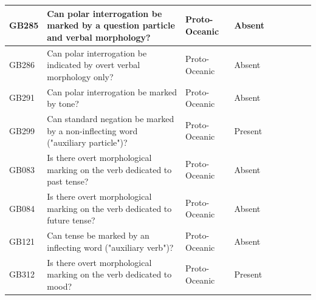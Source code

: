 \documentclass[draft,10pt]{article} %
\begin{document}
\begin{landscape}
\begin{longtable}{| p{2cm}| p{3cm}| p{2.5cm}|p{2cm}|p{2cm}|p{2cm}|p{2cm}|p{2cm}|p{2cm}|}
GB285&Can polar interrogation be marked by a question particle and verbal morphology?&Proto-Oceanic&Absent&\citet[89]{lynchrosscrowley_proto_grammar_oceanic}& \cellcolor{hedvig_lightgreen!50}{True Negative} & \cellcolor{hedvig_yellow!50}{Half} & \cellcolor{hedvig_yellow!50}{True Negative} & \cellcolor{hedvig_yellow!50}{Half} \\ \hline
GB286&Can polar interrogation be indicated by overt verbal morphology only?&Proto-Oceanic&Absent&\citet[89]{lynchrosscrowley_proto_grammar_oceanic}& \cellcolor{hedvig_lightgreen!50}{True Negative} & \cellcolor{hedvig_yellow!50}{Half} & \cellcolor{hedvig_yellow!50}{True Negative} & \cellcolor{hedvig_yellow!50}{Half} \\ \hline
GB291&Can polar interrogation be marked by tone?&Proto-Oceanic&Absent&\citet[89]{lynchrosscrowley_proto_grammar_oceanic}& \cellcolor{hedvig_lightgreen!50}{True Negative} & \cellcolor{hedvig_yellow!50}{Half} & \cellcolor{hedvig_yellow!50}{True Negative} & \cellcolor{hedvig_yellow!50}{Half} \\ \hline
GB299&Can standard negation be marked by a non-inflecting word ("auxiliary particle")?&Proto-Oceanic&Present&\citet[88]{lynchrosscrowley_proto_grammar_oceanic}& \cellcolor{hedvig_lightgreen!50}{True Positive} & \cellcolor{hedvig_yellow!50}{Half} & \cellcolor{hedvig_lightgreen!50}{True Positive} & \cellcolor{hedvig_yellow!50}{Half} \\ \hline
GB083&Is there overt morphological marking on the verb dedicated to past tense?&Proto-Oceanic&Absent&\citet[84]{lynchrosscrowley_proto_grammar_oceanic}& \cellcolor{hedvig_lightgreen!50}{True Negative} & \cellcolor{hedvig_yellow!50}{Half} & \cellcolor{hedvig_yellow!50}{True Negative} & \cellcolor{hedvig_yellow!50}{Half} \\ \hline
GB084&Is there overt morphological marking on the verb dedicated to future tense?&Proto-Oceanic&Absent&\citet[84]{lynchrosscrowley_proto_grammar_oceanic}& \cellcolor{hedvig_lightgreen!50}{True Negative} & \cellcolor{hedvig_yellow!50}{Half} & \cellcolor{hedvig_yellow!50}{True Negative} & \cellcolor{hedvig_yellow!50}{Half} \\ \hline
GB121&Can tense be marked by an inflecting word ("auxiliary verb")?&Proto-Oceanic&Absent&\citet[84]{lynchrosscrowley_proto_grammar_oceanic}& \cellcolor{hedvig_lightgreen!50}{True Negative} & \cellcolor{hedvig_yellow!50}{Half} & \cellcolor{hedvig_yellow!50}{True Negative} & \cellcolor{hedvig_yellow!50}{Half} \\ \hline
GB312&Is there overt morphological marking on the verb dedicated to mood?&Proto-Oceanic&Present&\citet[84]{lynchrosscrowley_proto_grammar_oceanic}& \cellcolor{hedvig_red!50}{False Negative} & \cellcolor{hedvig_yellow!50}{Half} & \cellcolor{hedvig_lightgreen!50}{True Positive} & \cellcolor{hedvig_lightgreen!50}{True Positive} \\ \hline

\end{longtable}
\end{landscape}
\end{document}
